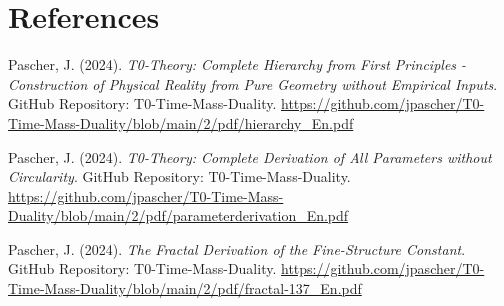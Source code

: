 \documentclass[12pt,a4paper]{article}
\begin{document}
\section{References}

\begin{thebibliography}{99}

Pascher, J. (2024). \textit{T0-Theory: Complete Hierarchy from First Principles - Construction of Physical Reality from Pure Geometry without Empirical Inputs}. 
GitHub Repository: T0-Time-Mass-Duality.
\url{https://github.com/jpascher/T0-Time-Mass-Duality/blob/main/2/pdf/hierarchy_En.pdf}

Pascher, J. (2024). \textit{T0-Theory: Complete Derivation of All Parameters without Circularity}. 
GitHub Repository: T0-Time-Mass-Duality.
\url{https://github.com/jpascher/T0-Time-Mass-Duality/blob/main/2/pdf/parameterderivation_En.pdf}

Pascher, J. (2024). \textit{The Fractal Derivation of the Fine-Structure Constant}. 
GitHub Repository: T0-Time-Mass-Duality.
\url{https://github.com/jpascher/T0-Time-Mass-Duality/blob/main/2/pdf/fractal-137_En.pdf}

\end{thebibliography}
\end{document}
